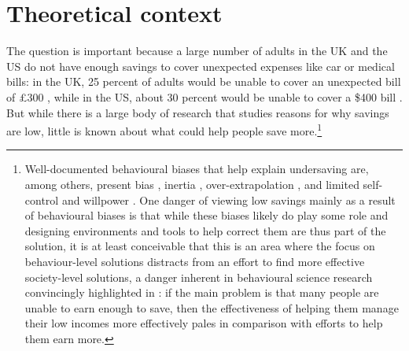
\section{Theoretical context}%
\label{sec:theoretical_context}


The question is important because a large number of adults in the UK and the US
do not have enough savings to cover unexpected expenses like car or medical
bills: in the UK, 25 percent of adults would be unable to cover an unexpected
bill of \pounds300 \citep{philipps2021supporting}, while in the US, about 30
percent would be unable to cover a \$400 bill \citep{fed2022economic}. But
while there is a large body of research that studies reasons for why savings
are low, little is known about what could help people save
more.\footnote{Well-documented behavioural biases that help explain undersaving
    are, among others, present bias \citep{laibson1997golden,
    laibson2019intertemporal}, inertia \citep{madrian2001power},
    over-extrapolation \citep{choi2009reinforcement}, and limited self-control
    and willpower \citep{thaler1981economic, benhabib2005modeling,
    fudenberg2006dual, loewenstein2004animal, gul2001temptation}. One danger of
    viewing low savings mainly as a result of behavioural biases is that while
    these biases likely do play some role and designing environments and tools
    to help correct them are thus part of the solution, it is at least
    conceivable that this is an area where the focus on behaviour-level
    solutions distracts from an effort to find more effective society-level
    solutions, a danger inherent in behavioural science research convincingly
    highlighted in \citet{chater2022frame}: if the main problem is that many
people are unable to earn enough to save, then the effectiveness of helping
them manage their low incomes more effectively pales in comparison with efforts
to help them earn more.}

